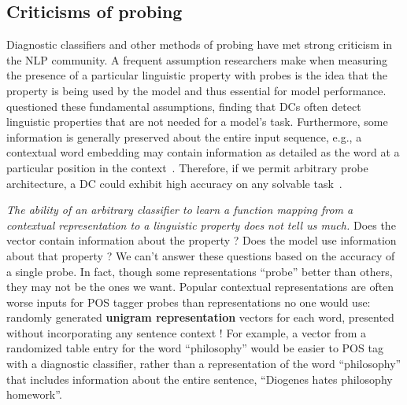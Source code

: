 \subsection{Criticisms of probing} 

Diagnostic classifiers and other methods of probing have met strong criticism in the NLP community. A frequent assumption researchers make when measuring the presence of a particular  linguistic property with probes is the idea that the property is being used by the model and thus essential for model performance. \citet{ravichander_probing_2020} questioned these fundamental assumptions, finding that DCs often detect linguistic properties that are not needed for a model's task. Furthermore, some information is generally preserved about the entire input sequence, e.g., a contextual word embedding may contain information as detailed as the word at a particular position in the context~\citep{conneau_what_2018}. Therefore, if we permit arbitrary probe architecture, a DC could exhibit high accuracy on any solvable task~\citep{pimentel_information-theoretic_2020}. 

\textit{The ability of an arbitrary classifier to learn a function mapping from a contextual representation to a linguistic property does not tell us much.} Does the vector contain information about the property \citep[it would anyway; ][]{pimentel_information-theoretic_2020}? Does the model use information about that property \citep[it still might not; ][]{ravichander_probing_2020}? We can't answer these questions based on the accuracy of a single probe. In fact, though some representations ``probe'' better than others, they may not be the ones we want. Popular contextual representations are often worse inputs for POS tagger probes than representations no one would use: randomly generated \textbf{unigram representation} vectors for each word, presented without incorporating any sentence context \citep{pimentel_pareto_2020,zhang_language_2018}! For example, a vector from a randomized table entry for the word ``philosophy'' would be easier to POS tag with a diagnostic classifier, rather than a representation of the word ``philosophy'' that includes information about the entire sentence, ``Diogenes hates philosophy homework''. 

